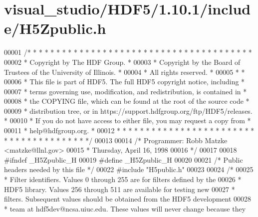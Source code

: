 \hypertarget{visual__studio_2_h_d_f5_21_810_81_2include_2_h5_zpublic_8h_source}{}\section{visual\+\_\+studio/\+H\+D\+F5/1.10.1/include/\+H5\+Zpublic.h}
\label{visual__studio_2_h_d_f5_21_810_81_2include_2_h5_zpublic_8h_source}

\begin{DoxyCode}
00001 \textcolor{comment}{/* * * * * * * * * * * * * * * * * * * * * * * * * * * * * * * * * * * * * * *}
00002 \textcolor{comment}{ * Copyright by The HDF Group.                                               *}
00003 \textcolor{comment}{ * Copyright by the Board of Trustees of the University of Illinois.         *}
00004 \textcolor{comment}{ * All rights reserved.                                                      *}
00005 \textcolor{comment}{ *                                                                           *}
00006 \textcolor{comment}{ * This file is part of HDF5.  The full HDF5 copyright notice, including     *}
00007 \textcolor{comment}{ * terms governing use, modification, and redistribution, is contained in    *}
00008 \textcolor{comment}{ * the COPYING file, which can be found at the root of the source code       *}
00009 \textcolor{comment}{ * distribution tree, or in https://support.hdfgroup.org/ftp/HDF5/releases.  *}
00010 \textcolor{comment}{ * If you do not have access to either file, you may request a copy from     *}
00011 \textcolor{comment}{ * help@hdfgroup.org.                                                        *}
00012 \textcolor{comment}{ * * * * * * * * * * * * * * * * * * * * * * * * * * * * * * * * * * * * * * */}
00013 
00014 \textcolor{comment}{/* Programmer:  Robb Matzke <matzke@llnl.gov>}
00015 \textcolor{comment}{ *              Thursday, April 16, 1998}
00016 \textcolor{comment}{ */}
00017 
00018 \textcolor{preprocessor}{#ifndef \_H5Zpublic\_H}
00019 \textcolor{preprocessor}{#define \_H5Zpublic\_H}
00020 
00021 \textcolor{comment}{/* Public headers needed by this file */}
00022 \textcolor{preprocessor}{#include "H5public.h"}
00023 
00024 \textcolor{comment}{/*}
00025 \textcolor{comment}{ * Filter identifiers.  Values 0 through 255 are for filters defined by the}
00026 \textcolor{comment}{ * HDF5 library.  Values 256 through 511 are available for testing new}
00027 \textcolor{comment}{ * filters. Subsequent values should be obtained from the HDF5 development}
00028 \textcolor{comment}{ * team at hdf5dev@ncsa.uiuc.edu.  These values will never change because they}

\end{DoxyCode}
